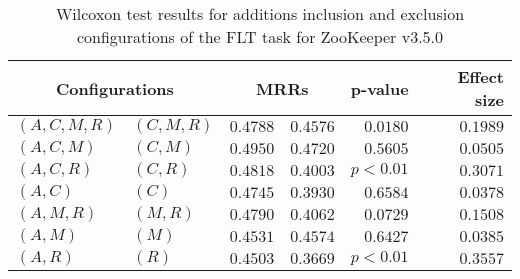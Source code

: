 
\begin{table}
\begin{spacing}{1.2}
\centering
\caption{Wilcoxon test results for additions inclusion and exclusion configurations of the FLT task for ZooKeeper v3.5.0}
\label{table:versus-wilcox-zookeeper-flt-additions}
\begin{tabular}{ll|rr|rr}
\toprule
      \multicolumn{2}{c|}{Configurations} &          \multicolumn{2}{c|}{MRRs} &       p-value & Effect size \\
\midrule
 $(A,C,M,R)$ &  $(C,M,R)$ & $0.4788$ & $0.4576$ & $0.0180$ &    $0.1989$ \\
   $(A,C,M)$ &    $(C,M)$ & $0.4950$ & $0.4720$ & $0.5605$ &    $0.0505$ \\
   $(A,C,R)$ &    $(C,R)$ & $0.4818$ & $0.4003$ & $p<0.01$ &    $0.3071$ \\
     $(A,C)$ &      $(C)$ & $0.4745$ & $0.3930$ & $0.6584$ &    $0.0378$ \\
   $(A,M,R)$ &    $(M,R)$ & $0.4790$ & $0.4062$ & $0.0729$ &    $0.1508$ \\
     $(A,M)$ &      $(M)$ & $0.4531$ & $0.4574$ & $0.6427$ &    $0.0385$ \\
     $(A,R)$ &      $(R)$ & $0.4503$ & $0.3669$ & $p<0.01$ &    $0.3557$ \\
\bottomrule
\end{tabular}

\end{spacing}
\end{table}

